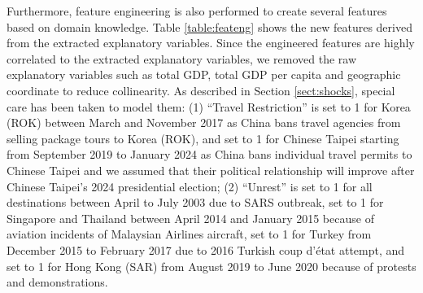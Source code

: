 \documentclass{article}
\begin{document}
Furthermore, feature engineering is also performed to create several features based on domain knowledge. Table \ref{table:feateng} shows the new features derived from the extracted explanatory variables. Since the engineered features are highly correlated to the extracted explanatory variables, we removed the raw explanatory variables such as total GDP, total GDP per capita and geographic coordinate to reduce collinearity. As described in Section \ref{sect:shocks}, special care has been taken to model them: (1) ``Travel Restriction'' is set to 1 for Korea (ROK) between March and November 2017 as China bans travel agencies from selling package tours to Korea (ROK), and set to 1 for Chinese Taipei starting from September 2019 to January 2024 as China bans individual travel permits to Chinese Taipei and we assumed that their political relationship will improve after Chinese Taipei's 2024 presidential election; (2) ``Unrest'' is set to 1 for all destinations between April to July 2003 due to SARS outbreak, set to 1 for Singapore and Thailand between April 2014 and January 2015 because of aviation incidents of Malaysian Airlines aircraft, set to 1 for Turkey from December 2015 to February 2017 due to 2016 Turkish coup d'état attempt, and set to 1 for Hong Kong (SAR) from August 2019 to June 2020 because of protests and demonstrations.
\end{document}

